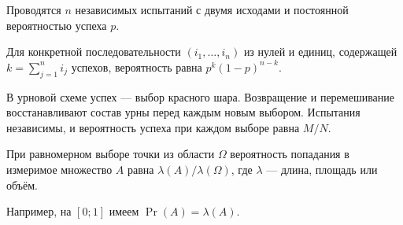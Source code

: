 \begin{definition}
Проводятся $n$ независимых испытаний с двумя исходами и постоянной вероятностью успеха $p$.

\smallskip
Для конкретной последовательности $(i_1,\ldots,i_n)$ из нулей и единиц, содержащей $k=\sum_{j=1}^n i_j$ успехов, вероятность равна $p^k(1-p)^{n-k}$.
\end{definition}
В урновой схеме успех — выбор красного шара. Возвращение и перемешивание восстанавливают состав урны перед каждым новым выбором. Испытания независимы, и вероятность успеха при каждом выборе равна $M/N$.


\begin{definition}
При равномерном выборе точки из области $\Omega$ вероятность попадания в измеримое множество $A$ равна $\lambda(A)/\lambda(\Omega)$, где $\lambda$ — длина, площадь или объём.

\smallskip
Например, на $[0;1]$ имеем $\Pr(A)=\lambda(A)$.
\end{definition}

